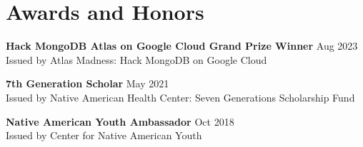 \documentclass[letterpaper, 10pt]{article}
\newcommand{\secStartSpace}{\vspace{3pt}}
\newcommand{\secEndSpace}{\vspace{5pt}}
\begin{document}
\section{ \color{black} \hspace{-8pt} \large \textbf{Awards and Honors} }

\secStartSpace
\noindent \normalsize \vspace{2pt} \textbf{Hack MongoDB Atlas on Google Cloud Grand Prize Winner} \hfill \normalsize{Aug 2023} \\
    \setlength \parindent{1cm} 
    \vspace{3pt} \hspace{0pt}
    Issued by Atlas Madness: Hack MongoDB on Google Cloud
    \vspace{3pt}

\noindent \normalsize \vspace{2pt} \textbf{7th Generation Scholar} \hfill \normalsize{May 2021} \\
    \setlength \parindent{1cm} 
    \vspace{3pt} \hspace{0pt}
    Issued by Native American Health Center: Seven Generations Scholarship Fund
    \vspace{3pt}

\noindent \normalsize \vspace{2pt} \textbf{Native American Youth Ambassador} \hfill \normalsize{Oct 2018} \\
    \setlength \parindent{1cm} 
    \vspace{3pt} \hspace{0pt}
    Issued by Center for Native American Youth

\secEndSpace
\end{document}
